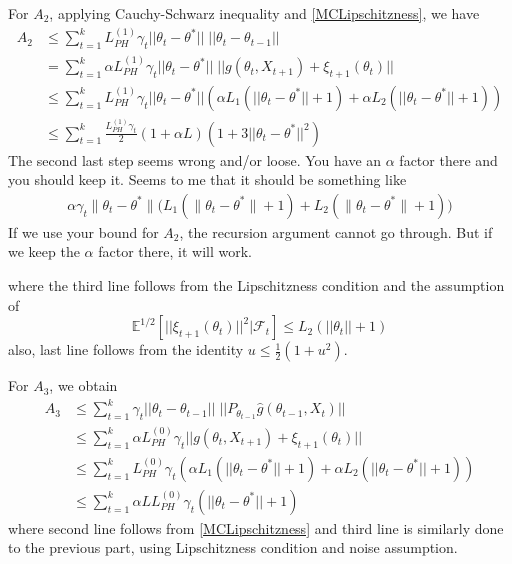 \documentclass[a4paper]{article}
\newcommand{\norm}[1]{\|#1 \|}
\newcommand{\thetastar}{\theta^*}
\newcommand{\mwlcomment}[1]{{\color{orange} #1}}
\newcommand{\stepsize}{\alpha}
\begin{document}
For $A_{2}$, applying Cauchy-Schwarz inequality and \ref{MCLipschitzness}, we have
\begin{equation}
	\begin{split}
		A_{2} & \le \sum_{t = 1}^{k}L_{PH}^{(1)}\gamma_{t}||\theta_{t} - \theta^{*}||\;||\theta_{t} - \theta_{t - 1}||\\
		& = \sum_{t = 1}^{k}\alpha L_{PH}^{(1)}\gamma_{t}||\theta_{t} - \theta^{*}||\;||g(\theta_{t}, X_{t + 1}) + \xi_{t +‌1}(\theta_{t})||\\
		& \le \sum_{t = 1}^{k}L_{PH}^{(1)} \gamma_{t}||\theta_{t} - \theta^{*}||\left(\alpha L_{1}\left(||\theta_{t} - \theta^{*}|| + 1\right) + \alpha L_{2}\left(||\theta_{t} - \theta^{*}|| + 1\right)\right)\\
		& \le \sum_{t = 1}^{k}\frac{L_{PH}^{(1)}\gamma_{t}}{2}(1 + \alpha L)\left(1 + 3||\theta_{t} - \theta^{*}||^{2} \right)
	\end{split}
\end{equation}
\mwlcomment{The second last step seems wrong and/or loose. You have an $\stepsize$ factor there and you should keep it. Seems to me that it should be something like
\begin{align*}
	 \stepsize \gamma_{t} \norm{\theta_{t} - \thetastar} \Big( L_{1} (\norm{\theta_{t} - \thetastar} + 1 ) + L_{2} (\norm{\theta_{t} - \thetastar} + 1) \Big)
\end{align*}
If we use your bound for $A_2$, the recursion argument cannot go through. But if we keep the $\stepsize$ factor there, it will work.
}




where the third line follows from the Lipschitzness condition and the assumption of
$$\mathbb{E}^{1 / 2}\left[||\xi_{t + 1}\left(\theta_{t}\right)||^{2} | \mathcal{F}_{t}\right] \le L_{2}\left(||\theta_{t}|| + 1\right)$$
also, last line follows from the identity $u \le \frac{1}{2}(1 + u^{2})$.

For $A_{3}$, we obtain
\begin{equation}
	\begin{split}
		A_{3} & \le \sum_{t = 1}^{k}\gamma_{t}||\theta_{t} - \theta_{t - 1}|| \; ||P_{\theta_{t - 1}}\hat{g}\left(\theta_{t - 1}, X_{t}\right)||\\
		& \le \sum_{t = 1}^{k}\alpha L_{PH}^{(0)}\gamma_{t}||g\left(\theta_{t}, X_{t + 1}\right)‌ + \xi_{t + 1}(\theta_{t})||\\
		& \le \sum_{t = 1}^{k}L_{PH}^{(0)}\gamma_{t}\left(\alpha L_{1}\left(||\theta_{t} - \theta^{*}|| + 1\right) + \alpha L_{2}\left(||\theta_{t} - \theta^{*}|| + 1\right)\right)\\
		& \le \sum_{t = 1}^{k}\alpha L L_{PH}^{(0)}\gamma_{t}\left(||\theta_{t} - \theta^{*}|| + 1\right)
	\end{split}
\end{equation}
where second line follows from \ref{MCLipschitzness} and third line is similarly done to the previous part, using Lipschitzness condition and noise assumption.
\end{document}
